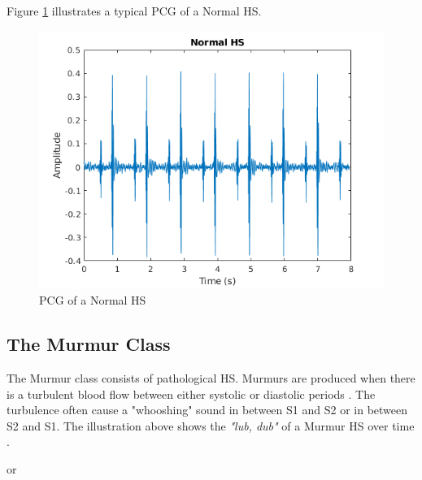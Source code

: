 \documentclass[10pt,twocolumn]{witseiepaper}
\begin{document}

Figure \ref{fig:normal} illustrates a typical PCG of a Normal HS.
\begin{figure}[h!]
    \centering
    \includegraphics[scale = 0.45]{./normal.png}
    \caption{PCG of a Normal HS}
    \label{fig:normal}
\end{figure}{}

\subsection*{The Murmur Class}
The Murmur class consists of pathological HS. Murmurs are produced when there is a turbulent blood flow between either systolic or diastolic periods \cite{35}. The turbulence often cause a "whooshing" sound in between S1 and S2 or in between S2 and S1. The illustration above shows the \textit{"lub, dub"} of a Murmur HS over time \cite{bentley}.


\hspace{3.5cm} or 

\end{document}
